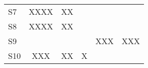 \documentclass[../../UsabilityReport.tex]{subfiles}
\begin{document}
\begin{table}[htb]
{\begin{tabular}{lccccc}
				\multicolumn{1}{l|}{S7}  & \multicolumn{1}{c|}{XXXX}                                                    & \multicolumn{1}{c|}{XX}   & \multicolumn{1}{c|}{}       & \multicolumn{1}{c|}{}        & \multicolumn{1}{c|}{}                                                           \\ \cline{2-6} 
				\multicolumn{1}{l|}{S8}  & \multicolumn{1}{c|}{XXXX}                                                    & \multicolumn{1}{c|}{XX}   & \multicolumn{1}{c|}{}       & \multicolumn{1}{c|}{}        & \multicolumn{1}{c|}{}                                                           \\ \cline{2-6} 
				\multicolumn{1}{l|}{S9}  & \multicolumn{1}{c|}{}                                                        & \multicolumn{1}{c|}{}     & \multicolumn{1}{c|}{}       & \multicolumn{1}{c|}{XXX}     & \multicolumn{1}{c|}{XXX}                                                        \\ \cline{2-6} 
				\multicolumn{1}{l|}{S10} & \multicolumn{1}{c|}{XXX}                                                     & \multicolumn{1}{c|}{XX}   & \multicolumn{1}{c|}{X}      & \multicolumn{1}{c|}{}        & \multicolumn{1}{c|}{}                                                           \\ \cline{2-6} 
			\end{tabular}%
		}
	\end{table}
\end{document}
